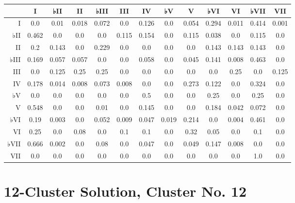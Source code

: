 \begin{table}[htbp]
\begin{minipage}{\linewidth}
\setlength{\tymax}{0.5\linewidth}
\centering
\small
\begin{tabulary}{\textwidth}{@{}RCCCCCCCCCCCC@{}} \toprule
&I&♭II&II&♭III&III&IV&♭V&V&♭VI&VI&♭VII&VII\\
\midrule
I&0.0&0.01&0.018&0.072&0.0&0.126&0.0&0.054&0.294&0.011&0.414&0.001\\
♭II&0.462&0.0&0.0&0.0&0.115&0.154&0.0&0.115&0.038&0.0&0.115&0.0\\
II&0.2&0.143&0.0&0.229&0.0&0.0&0.0&0.0&0.143&0.143&0.143&0.0\\
♭III&0.169&0.057&0.057&0.0&0.0&0.058&0.0&0.045&0.141&0.008&0.463&0.0\\
III&0.0&0.125&0.25&0.25&0.0&0.0&0.0&0.0&0.0&0.25&0.0&0.125\\
IV&0.178&0.014&0.008&0.073&0.008&0.0&0.0&0.273&0.122&0.0&0.324&0.0\\
♭V&0.0&0.0&0.0&0.0&0.0&0.5&0.0&0.0&0.25&0.0&0.25&0.0\\
V&0.548&0.0&0.0&0.01&0.0&0.145&0.0&0.0&0.184&0.042&0.072&0.0\\
♭VI&0.19&0.003&0.0&0.052&0.009&0.047&0.019&0.214&0.0&0.004&0.461&0.0\\
VI&0.25&0.0&0.08&0.0&0.1&0.1&0.0&0.32&0.05&0.0&0.1&0.0\\
♭VII&0.666&0.002&0.0&0.08&0.0&0.047&0.0&0.049&0.147&0.008&0.0&0.0\\
VII&0.0&0.0&0.0&0.0&0.0&0.0&0.0&0.0&0.0&0.0&1.0&0.0\\

\bottomrule

\end{tabulary}
\end{minipage}
\end{table}

\section{12-Cluster Solution, Cluster No. 12}
\label{12-clustersolutionclusterno.12}

